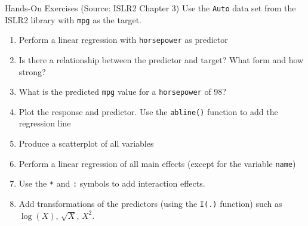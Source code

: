 \documentclass[ignorenonframetext,xcolor=x11names]{beamer}
\begin{document}


\begin{frame}{Hands-On Exercises}
{\small (Source: ISLR2 Chapter 3)}
\small
Use the \texttt{Auto} data set from the ISLR2 library with \texttt{mpg} as the target.
  \begin{enumerate}
     \item Perform a linear regression with \texttt{horsepower} as predictor
     \item Is there a relationship between the predictor and target? What form and how strong?
     \item What is the predicted \texttt{mpg} value for a \texttt{horsepower} of 98? 
     \item Plot the response and predictor. Use the \texttt{abline()} function to add the regression line
     \item Produce a scatterplot of all variables
     \item Perform a linear regression of all main effects (except for the variable \texttt{name})
     \item Use the \texttt{*} and \texttt{:} symbols to add interaction effects.
     \item Add transformations of the predictors (using the \texttt{I(.)} function) such as $\log(X)$, $\sqrt{X}$, $X^2$.
  \end{enumerate}
\end{frame}
\end{document}
